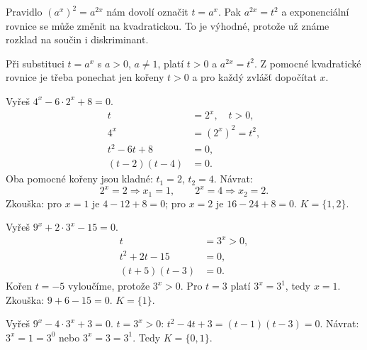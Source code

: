 \documentclass[11pt,a4paper]{article}
\begin{document}
Pravidlo $(a^x)^2=a^{2x}$ nám dovolí označit $t=a^x$. Pak $a^{2x}=t^2$ a exponenciální rovnice se může změnit na kvadratickou. To je výhodné, protože už známe rozklad na součin i diskriminant.
\begin{zadaniBox}[title={Věta - Kvadratická substituce}]
Při substituci $t=a^x$ s $a>0$, $a\ne1$, platí $t>0$ a $a^{2x}=t^2$. Z pomocné kvadratické rovnice je třeba ponechat jen kořeny $t>0$ a pro každý zvlášť dopočítat $x$.
\end{zadaniBox}
\begin{prikladReseniBox}[title={Příklad 1}]
Vyřeš $4^x-6\cdot2^x+8=0$.
\tcblower
\[\begin{aligned}t&=2^x,\quad t>0,\\4^x&=(2^x)^2=t^2,\\t^2-6t+8&=0,\\(t-2)(t-4)&=0.\end{aligned}\]
Oba pomocné kořeny jsou kladné: $t_1=2$, $t_2=4$. Návrat:
\[2^x=2\Rightarrow x_1=1,\qquad 2^x=4\Rightarrow x_2=2.\]
Zkouška: pro $x=1$ je $4-12+8=0$; pro $x=2$ je $16-24+8=0$. $K=\{1,2\}$.
\end{prikladReseniBox}
\begin{prikladReseniBox}[title={Příklad 2}]
Vyřeš $9^x+2\cdot3^x-15=0$.
\tcblower
\[\begin{aligned}t&=3^x>0,\\t^2+2t-15&=0,\\(t+5)(t-3)&=0.\end{aligned}\]
Kořen $t=-5$ vyloučíme, protože $3^x>0$. Pro $t=3$ platí $3^x=3^1$, tedy $x=1$. Zkouška: $9+6-15=0$. $K=\{1\}$.
\end{prikladReseniBox}
\begin{prikladReseniBox}[title={Příklad 3}]
Vyřeš $9^x-4\cdot3^x+3=0$.
\tcblower
$t=3^x>0$: $t^2-4t+3=(t-1)(t-3)=0$. Návrat: $3^x=1=3^0$ nebo $3^x=3=3^1$. Tedy $K=\{0,1\}$.
\end{prikladReseniBox}
\end{document}
